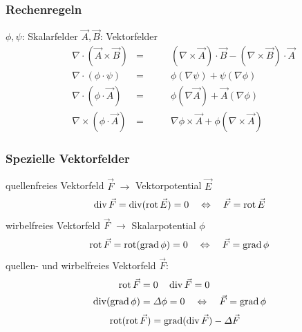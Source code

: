 \subsubsection{Rechenregeln}
$\phi, \psi$: Skalarfelder \qquad $\vec{A}, \vec{B}$: Vektorfelder
\begin{align*}
     & \nabla \cdot (\vec{A} \times \vec{B}) & = & \qquad (\nabla \times \vec{A})\cdot\vec{B} - (\nabla\times\vec{B})\cdot\vec{A} \\
     & \nabla \cdot (\phi \cdot \psi)        & = & \qquad \phi (\nabla \psi) + \psi( \nabla \phi)                                  \\
     & \nabla \cdot (\phi \cdot \vec{A})           & = & \qquad \phi (\nabla \vec{A}) + \vec{A}(\nabla \phi)                             \\
     & \nabla \times (\phi \cdot \vec{A})          & = & \qquad \nabla \phi \times \vec{A} + \phi (\nabla \times \vec{A})                        
\end{align*}

\subsubsection{Spezielle Vektorfelder}
quellenfreies Vektorfeld $\vec{F}$ $\rightarrow$ Vektorpotential $\vec{E}$
\begin{align*}
\operatorname{div} \vec{F} = \operatorname{div} (\operatorname{rot} \vec{E}) = 0 \quad \Leftrightarrow \quad  \vec{F} = \operatorname{rot} \vec{E}
\end{align*}
wirbelfreies Vektorfeld $\vec{F}$ $\rightarrow$ Skalarpotential $\phi$
\begin{align*}
    \operatorname{rot} \vec{F} = \operatorname{rot} (\operatorname{grad} \phi) = 0 \quad \Leftrightarrow \quad  \vec{F} = \operatorname{grad} \phi
\end{align*}
quellen- und wirbelfreies Vektorfeld $\vec{F}$:
\begin{align*}
    \operatorname{rot} \vec{F}  & = 0 \quad \operatorname{div} \vec{F} = 0\\
    \operatorname{div} (\operatorname{grad} \phi) & = \varDelta \phi = 0 \quad \Leftrightarrow \quad  \vec{F} = \operatorname{grad} \phi
\end{align*}
\begin{align*}
    \operatorname{rot} (\operatorname{rot} \vec{F})  & = \operatorname{grad} (\operatorname{div} \vec{F}) - \varDelta \vec{F} 
\end{align*}

